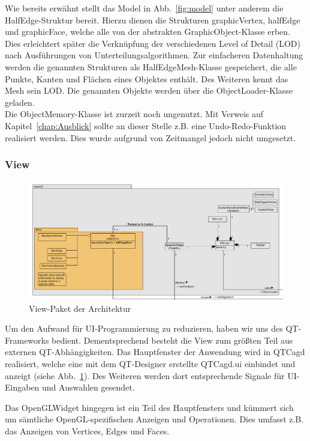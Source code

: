 Wie bereits erwähnt stellt das Model in Abb.~\ref{fig:model} unter anderem die HalfEdge-Struktur bereit. 
Hierzu dienen die Strukturen graphicVertex, halfEdge und graphicFace, welche alle von der abstrakten GraphicObject-Klasse erben. 
Dies erleichtert später die Verknüpfung der verschiedenen Level of Detail (LOD) nach Ausführungen von Unterteilungsalgorithmen. 
Zur einfacheren Datenhaltung werden die genannten Strukturen als HalfEdgeMesh-Klasse gespeichert, die alle Punkte, Kanten und Flächen eines Objektes enthält. 
Des Weiteren kennt das Mesh sein LOD. 
Die genannten Objekte werden über die ObjectLoader-Klasse geladen.\\

Die ObjectMemory-Klasse ist zurzeit noch ungenutzt. 
Mit Verweis auf Kapitel~\ref{chap:Ausblick} sollte an dieser Stelle z.B. eine Undo-Redo-Funktion realisiert werden. 
Dies wurde aufgrund von Zeitmangel jedoch nicht umgesetzt.

\subsubsection{View}
\begin{figure}[htbp]
\centering
\includegraphics[angle=90,scale=0.6]{content/pictures/architekturView.png}
\caption{View-Paket der Architektur}
\label{fig:view}
\end{figure}

Um den Aufwand für UI-Programmierung zu reduzieren, haben wir uns des QT-Frameworks bedient. 
Dementsprechend besteht die View zum grö\ss{}ten Teil aus externen QT-Abhängigkeiten. 
Das Hauptfenster der Anwendung wird in QTCagd realisiert, welche eine mit dem QT-Designer erstellte QTCagd.ui einbindet und anzeigt (siehe Abb.~\ref{fig:view}).
Des Weiteren werden dort entsprechende Signale für UI-Eingaben und Auswahlen gesendet.

Das OpenGLWidget hingegen ist ein Teil des Hauptfensters und kümmert sich um sämtliche OpenGL-spezifischen Anzeigen und Operationen.
Dies umfasst z.B. das Anzeigen von Vertices, Edges und Faces. 

